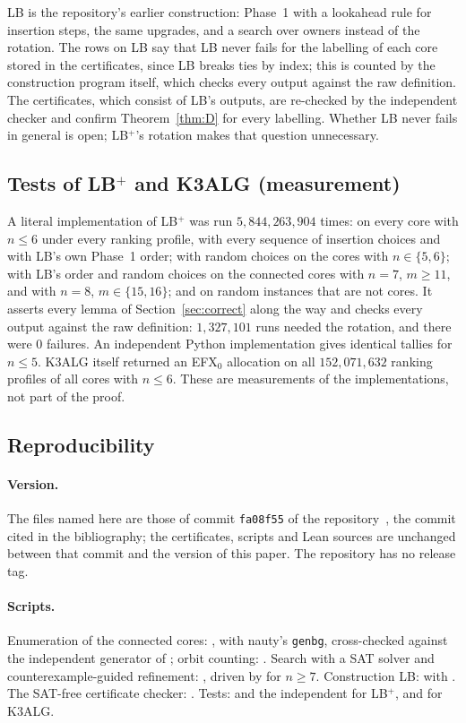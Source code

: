 \documentclass[runningheads,11pt]{llncs}
\newcommand{\efxz}{\texorpdfstring{\mbox{EFX$_0$}}{EFX0}}
\newcommand{\LBp}{\texorpdfstring{\mbox{LB$^{+}$}}{LB+}}
\begin{document}
\noindent LB is the repository's earlier construction: Phase~1 with a lookahead rule for insertion steps, the same upgrades, and a search over owners instead of the rotation. The rows on LB say that LB never fails for the labelling of each core stored in the certificates, since LB breaks ties by index; this is counted by the construction program itself, which checks every output against the raw definition. The certificates, which consist of LB's outputs, are re-checked by the independent checker and confirm Theorem~\ref{thm:D} for every labelling. Whether LB never fails in general is open; \LBp{}'s rotation makes that question unnecessary.

\subsection{Tests of \LBp{} and K3ALG (measurement)}\label{sec:tests}

A literal implementation of \LBp{} was run $5{,}844{,}263{,}904$ times: on every core with $n\le6$ under every ranking profile, with every sequence of insertion choices and with LB's own Phase~1 order; with random choices on the cores with $n\in\{5,6\}$; with LB's order and random choices on the connected cores with $n=7$, $m\ge11$, and with $n=8$, $m\in\{15,16\}$; and on random instances that are not cores. It asserts every lemma of Section~\ref{sec:correct} along the way and checks every output against the raw definition: $1{,}327{,}101$ runs needed the rotation, and there were $0$ failures. An independent Python implementation gives identical tallies for $n\le5$. K3ALG itself returned an \efxz{} allocation on all $152{,}071{,}632$ ranking profiles of all cores with $n\le6$. These are measurements of the implementations, not part of the proof.

\subsection{Reproducibility}

\paragraph{Version.} The files named here are those of commit \texttt{fa08f55} of the repository~\cite{Repo}, the commit cited in the bibliography; the certificates, scripts and Lean sources are unchanged between that commit and the version of this paper. The repository has no release tag.

\paragraph{Scripts.} Enumeration of the connected cores: , with nauty's \texttt{genbg}, cross-checked against the independent generator of ; orbit counting: . Search with a SAT solver and counterexample-guided refinement: , driven by  for $n\ge7$. Construction LB:  with . The SAT-free certificate checker: . Tests:  and the independent  for \LBp{}, and  for K3ALG.
\end{document}
